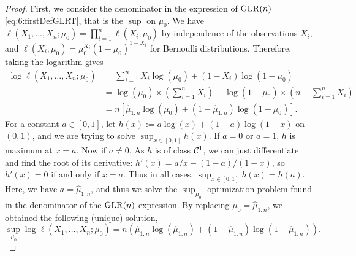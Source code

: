 \begin{proof}
    First, we consider the denominator in the expression of $\mathrm{GLR}(n)$ \eqref{eq:6:firstDefGLRT}, that is the $\sup$ on $\mu_0$.
    We have $\ell(X_1, \ldots, X_n ; \mu_0) = \prod_{i=1}^n \ell(X_i ; \mu_0)$ by independence of the observations $X_i$,
    and $\ell(X_i ; \mu_0) = \mu_0^{X_i} (1-\mu_0)^{1-X_i}$ for Bernoulli distributions.
    Therefore, taking the logarithm gives
    \begin{align*}
        \log\ell(X_1, \ldots, X_n ; \mu_0)
        &= \sum_{i=1}^n X_i \log(\mu_0) + (1-X_i) \log(1-\mu_0) \\
        &= \log(\mu_0) \times \left( \sum_{i=1}^n X_i \right) + \log(1-\mu_0) \times \left( n - \sum_{i=1}^n X_i \right) \\
        &= n \left[ \widehat{\mu}_{1:n} \log(\mu_0) + (1 - \widehat{\mu}_{1:n}) \log(1-\mu_0) \right].
    \end{align*}
    For a constant $a\in[0,1]$, let $h(x) := a \log(x) + (1-a) \log(1-x)$ on $(0,1)$,
    and we are trying to solve $\sup_{x\in[0,1]} h(x)$.
    If $a=0$ or $a=1$, $h$ is maximum at $x=a$.
    Now if $a\neq0$, As $h$ is of class $\mathcal{C}^1$, we can just differentiate and find the root of its derivative:
    $h'(x) = a/x - (1-a)/(1-x)$, so $h'(x) = 0$ if and only if $x=a$.
    Thus in all cases, $\sup_{x\in[0,1]} h(x) = h(a)$.
    Here, we have $a = \widehat{\mu}_{1:n}$, and thus we solve the $\sup_{\mu_0}$ optimization problem found in the denominator of the $\mathrm{GLR}(n)$ expression.
    By replacing $\mu_0 = \widehat{\mu}_{1:n}$, we obtained the following (unique) solution,
    \begin{equation}\label{eq:6:solutionPbOpt_for_1n}
        \sup_{\mu_0} \log\ell(X_1, \ldots, X_n ; \mu_0) = n \left( \widehat{\mu}_{1:n} \log(\widehat{\mu}_{1:n}) + (1 - \widehat{\mu}_{1:n}) \log(1-\widehat{\mu}_{1:n}) \right).
    \end{equation}


\end{proof}

